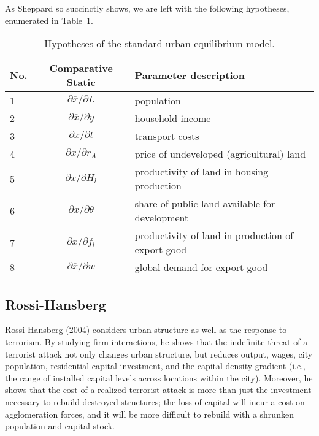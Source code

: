 \documentclass[preprint,2p,12pt]{elsarticle}
\begin{document}
As Sheppard so succinctly shows, we are left with the following hypotheses, enumerated in Table~\ref{generalHypotheses}.
\begin{table}[h!]
    \begin{tabular}{ | l | c | l | }\hline
    No. & Comparative Static & Parameter description                                                                    \\ \hline
    1   & $\partial \overline{x} / \partial L$                         & population                                                 \\ \hline
    2   & $\partial \overline{x} / \partial y$                         & household income                                           \\ \hline
    3   & $\partial \overline{x} / \partial t$                         & transport costs                                              \\ \hline
    4   & $\partial \overline{x} / \partial r_A$                         & price of undeveloped (agricultural) land                                     \\ \hline
    5   & $\partial \overline{x} / \partial H_l$                         & productivity of land in housing production     \\ \hline
    6   & $\partial \overline{x} / \partial \theta$                         & share of public land available for development                        \\ \hline
    7   & $\partial \overline{x} / \partial f_l$                         & productivity of land in production of export good \\ \hline
    8   & $\partial \overline{x} / \partial w$                         & global demand for export good                                \\ \hline
    \end{tabular}
    \caption{\label{generalHypotheses}Hypotheses of the standard urban equilibrium model.}
\end{table}


\subsection{\sc Rossi-Hansberg}
Rossi-Hansberg (2004) considers urban structure as well as the response to terrorism.
By studying firm interactions, he shows that the indefinite threat of a terrorist attack not only changes urban structure, but reduces output, wages, city population, residential capital investment, and the capital density gradient (i.e., the range of installed capital levels across locations within the city).
Moreover, he shows that the cost of a realized terrorist attack is more than just the investment necessary to rebuild destroyed structures; the loss of capital will incur a cost on agglomeration forces, and it will be more difficult to rebuild with a shrunken population and capital stock.
\end{document}
